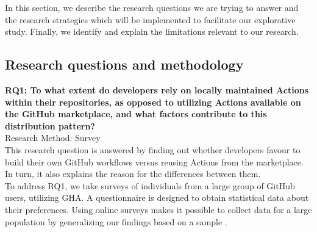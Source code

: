 \documentclass[conference]{IEEEtran}
\begin{document}
    In this section, we describe the research questions we are trying to answer and the research strategies which will be implemented to facilitate our explorative study. Finally, we identify and explain the limitations relevant to our research.

\subsection{Research questions and methodology}
    \textbf{RQ1: To what extent do developers rely on locally maintained Actions within their repositories, as opposed to utilizing Actions available on the GitHub marketplace, and what factors contribute to this distribution pattern?}\\

    Research Method: Survey\\
        
    This research question is answered by finding out whether developers favour to build their own GitHub workflows versus reusing Actions from the marketplace. In turn, it also explains the reason for the differences between them.\\

    To address RQ1, we take surveys of individuals from a large group of GitHub users, utilizing GHA. A questionnaire is designed to obtain statistical data about their preferences. Using online surveys makes it possible to collect data for a large population by generalizing our findings based on a sample \cite{linaker2013guidelines}.\\
\end{document}
